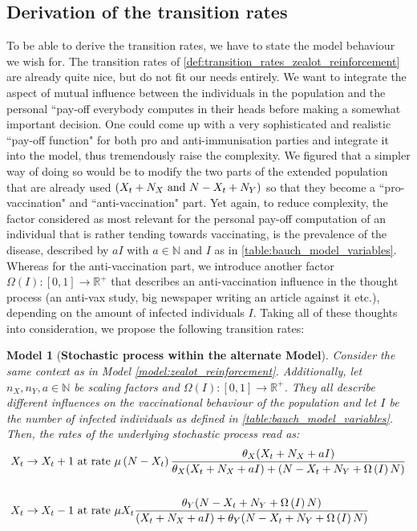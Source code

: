 \documentclass[12pt,a4paper,twoside]{article}
\newtheorem{model}{Model}[section]
\begin{document}
\subsection{Derivation of the transition rates}
To be able to derive the transition rates, we have to state the model behaviour we wish for. The transition rates of \eqref{def:transition_rates_zealot_reinforcement} are already quite nice, but do not fit our needs entirely. We want to integrate the aspect of mutual influence between the individuals in the population and the personal ``pay-off everybody computes in their heads before making a somewhat important decision. One could come up with a very sophisticated and realistic ``pay-off function" for both pro and anti-immunisation parties and integrate it into the model, thus tremendously raise the complexity. We figured that a simpler way of doing so would be to modify the two parts of the extended population that are already used $\left(X_t + N_X\textnormal{ and }N- X_t + N_Y\right)$ so that they become a ``pro-vaccination" and ``anti-vaccination" part. Yet again, to reduce complexity, the factor considered as most relevant for the personal pay-off computation of an individual that is rather tending towards vaccinating, is the prevalence of the disease, described by $aI$ with $a \in \mathbb{N}$ and $I$ as in \eqref{table:bauch_model_variables}. Whereas for the anti-vaccination part, we introduce another factor $\Omega\left(I\right): \left[0,1\right]\rightarrow \mathbb{R^+}$ that describes an anti-vaccination influence in the thought process (an anti-vax study, big newspaper writing an article against it etc.), depending on the amount of infected individuals $I$.
Taking all of these thoughts into consideration, we propose the following transition rates:
\begin{model}[\textbf{Stochastic process within the alternate Model}]
	Consider the same context as in Model \ref{model:zealot_reinforcement}. Additionally, let $n_X, n_Y, a \in \mathbb{N}$ be scaling factors and $\Omega\left(I\right): \left[0,1\right] \rightarrow \mathbb{R^+}$. They all describe different influences on the vaccinational behaviour of the population and let $I$ be the number of infected individuals as defined in \eqref{table:bauch_model_variables}. Then, the rates of the underlying stochastic process read as:
\begin{align}\label{def:transition_rates_my_model}
\begin{split}
X_t \rightarrow X_t + 1 & \textnormal{ at rate } \mu\left(N-X_t\right)\frac{\theta_X (X_t + N_X + aI)}{\theta_X (X_t + N_X + aI) + (N-X_t + N_Y + \Omega\left(I\right) N)} \\
&\\
X_t \rightarrow X_t - 1 & \textnormal{ at rate } \mu X_t\frac{\theta_Y(N-X_t+N_Y + \Omega\left(I\right) N)}{(X_t + N_X+aI) + \theta_Y(N-X_t+N_Y + \Omega\left(I\right) N)}
\end{split}
\end{align}
\end{model}
\end{document}
